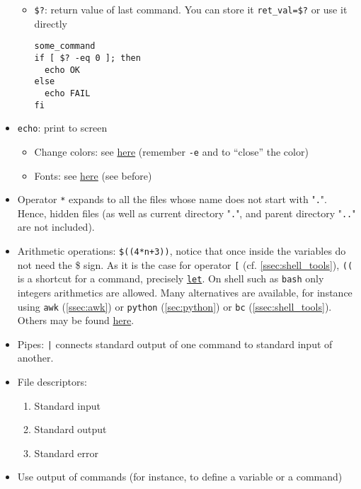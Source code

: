\documentclass[a4paper,12pt,%
              final%
              ]{article}
\begin{document}
\begin{itemize}
\begin{itemize}
      \item \verb|$?|: return value of last command. You can store it \verb|ret_val=$?| or use it directly
\begin{verbatim}
some_command
if [ $? -eq 0 ]; then
  echo OK
else
  echo FAIL
fi
\end{verbatim}
    \end{itemize}
  \item \texttt{echo}: print to screen
    \begin{itemize}
      \item Change colors: see \href{https://stackoverflow.com/questions/5947742/how-to-change-the-output-color-of-echo-in-linux}{here} (remember \verb|-e| and to ``close'' the color)
      \item Fonts: see \href{https://askubuntu.com/questions/528928/how-to-do-underline-bold-italic-strikethrough-color-background-and-size-i}{here} (see before)
    \end{itemize}
  \item Operator \texttt{*} expands to all the files whose name does not start with "\texttt{.}". Hence, hidden files (as well as current directory "\texttt{.}", and parent directory "\texttt{..}" are not included).
  \item Arithmetic operations: \verb|$((4*n+3))|, notice that once inside the variables do not need the \$ sign. As it is the case for operator \verb|[| (cf. \autoref{ssec:shell_tools}), \verb|((| is a shortcut for a command, precisely \href{https://www.computerhope.com/unix/bash/let.htm}{\texttt{let}}. On shell such as \texttt{bash} only integers arithmetics are allowed. Many alternatives are available, for instance using \texttt{awk} (\autoref{ssec:awk}) or \texttt{python} (\autoref{sec:python}) or \texttt{bc} (\autoref{ssec:shell_tools}). Others may be found \href{https://unix.stackexchange.com/questions/40786/how-to-do-integer-float-calculations-in-bash-or-other-languages-frameworks}{here}.
  \item Pipes: \verb!|! connects standard output of one command to standard input of another.
  \item File descriptors:
    \begin{enumerate}[start=0,label={\texttt{\arabic*} :}]
      \item Standard input
      \item Standard output
      \item Standard error
    \end{enumerate}
  \item Use output of commands (for instance, to define a variable or a command)

\end{itemize}
\end{document}
